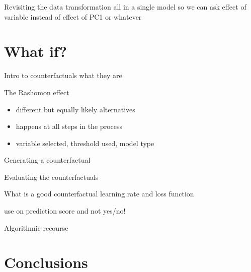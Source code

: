 \documentclass[12pt, smalloffset, compress, aspectratio=1610]{beamer}
\providecommand{\tightlist}{%
  \setlength{\itemsep}{0pt}\setlength{\parskip}{0pt}}
\begin{document}
\begin{frame}{Revisiting the data transformation}
\label{revisiting-the-data-transformation}
all in a single model so we can ask effect of variable instead of effect
of PC1 or whatever
\end{frame}

\section{What if?}\label{what-if}

\begin{frame}{Intro to counterfactuals}
\label{intro-to-counterfactuals}
what they are
\end{frame}

\begin{frame}{The Rashomon effect}
\label{the-rashomon-effect}
\begin{itemize}
\tightlist
\item
  different but equally likely alternatives
\item
  happens at all steps in the process
\item
  variable selected, threshold used, model type
\end{itemize}
\end{frame}

\begin{frame}{Generating a counterfactual}
\label{generating-a-counterfactual}
\end{frame}

\begin{frame}{Evaluating the counterfactuals}
\label{evaluating-the-counterfactuals}
\end{frame}

\begin{frame}{What is a good counterfactual}
\label{what-is-a-good-counterfactual}
learning rate and loss function

use on prediction score and not yes/no!
\end{frame}

\begin{frame}{Algorithmic recourse}
\label{algorithmic-recourse}
\end{frame}

\section{Conclusions}\label{conclusions}
\end{document}
